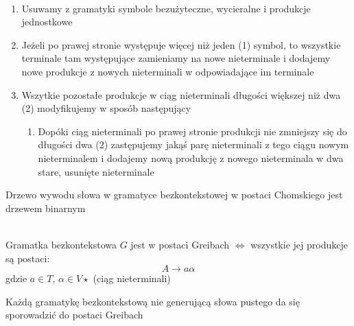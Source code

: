	\begin{alg}~\\
		\begin{enumerate}
			\item Usuwamy z gramatyki symbole bezużyteczne, wycieralne i produkcje jednostkowe
			\item Jeżeli po prawej stronie występuje więcej niż jeden (1) symbol, to wszystkie
			terminale tam występujące zamieniamy na nowe nieterminale i dodajemy
			nowe produkcje z nowych nieterminali w odpowiadające im terminale
			\item Wszytkie pozostałe produkcje w ciąg nieterminali długości większej niż dwa (2)
			modyfikujemy w sposób następujący
				\begin{enumerate}
					\item Dopóki ciąg nieterminali po prawej stronie produkcji nie zmniejszy się do długości dwa (2)
					zastępujemy jakąś parę nieterminali z tego ciągu nowym nieterminalem i dodajemy nową produkcję
					z nowego nieterminala w dwa stare, usunięte nieterminale
				\end{enumerate}
		\end{enumerate}
	\end{alg}
	
	\begin{uwaga}
		Drzewo wywodu słowa w gramatyce bezkontekstowej w postaci Chomskiego jest drzewem binarnym
	\end{uwaga}
	
	\begin{df}~\\
		Gramatka bezkontekstowa $G$ jest w postaci Greibach $\Leftrightarrow$ wszystkie jej produkcje są postaci:
		$$
			A \rightarrow a\alpha
		$$
		gdzie $a\in T$, $\alpha \in V\star$ (ciąg nieterminali)
	\end{df}
	
	\begin{lemat}
		Każdą gramatykę bezkontekstową nie generującą słowa pustego da się sporowadzić do postaci Greibach
	\end{lemat}
	
